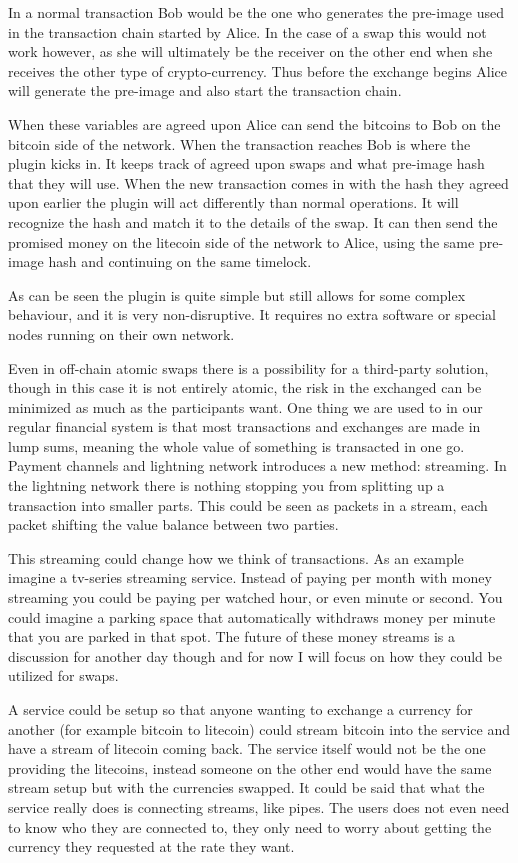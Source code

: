 In a normal transaction Bob would be the one who generates the pre-image used 
in the transaction chain started by Alice. In the case of a swap this would not 
work however, as she will ultimately be the receiver on the other end
when she receives the other type of crypto-currency. Thus before the exchange
begins Alice will generate the pre-image and also start the transaction chain.

When these variables are agreed upon Alice can send the bitcoins to Bob on the
bitcoin side of the network. When the transaction reaches Bob is where the plugin
kicks in. It keeps track of agreed upon swaps and what pre-image hash that they
will use. When the new transaction comes in with the hash they agreed upon earlier
the plugin will act differently than normal operations. It will recognize the hash
and match it to the details of the swap. It can then send the promised money on 
the litecoin side of the network to Alice, using the same pre-image hash and 
continuing on the same timelock. 

As can be seen the plugin is quite simple but still allows for some complex 
behaviour, and it is very non-disruptive. It requires no extra software or special
nodes running on their own network. 

Even in off-chain atomic swaps there is a possibility for a third-party solution, 
though in this case it is not entirely atomic, the risk in the exchanged can be 
minimized as much as the participants want. One thing we are used to in our regular
financial system is that most transactions and exchanges are made in lump sums, meaning 
the whole value of something is transacted in one go. Payment channels and lightning network 
introduces a new method: streaming. In the lightning network there is nothing stopping you 
from splitting up a transaction into smaller parts. This could be seen
as packets in a stream, each packet shifting the value balance between two parties. 

This streaming could change how we think of transactions. As an example imagine a tv-series 
streaming service. Instead of paying per month with money streaming you could be paying per 
watched hour, or even minute or second. You could imagine a parking space that automatically
withdraws money per minute that you are parked in that spot. The future of these money streams 
is a discussion for another day though and for now I will focus on how they could be utilized 
for swaps.

A service could be setup so that anyone wanting to exchange a currency for 
another (for example bitcoin to litecoin) could stream bitcoin into the service and have 
a stream of litecoin coming back. The service itself would not be the one providing 
the litecoins, instead someone on the other end would have the same stream setup
but with the currencies swapped. It could be said that what the service really does is 
connecting streams, like pipes. The users does not even need to know who they are 
connected to, they only need to worry about getting the currency they requested 
at the rate they want.

